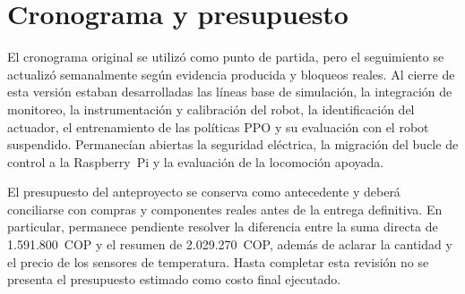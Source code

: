 \chapter{Cronograma y presupuesto}

El cronograma original se utilizó como punto de partida, pero el seguimiento
se actualizó semanalmente según evidencia producida y bloqueos reales. Al cierre
de esta versión estaban desarrolladas las líneas base de simulación, la
integración de monitoreo, la instrumentación y calibración del robot, la
identificación del actuador, el entrenamiento de las políticas PPO y su
evaluación con el robot suspendido. Permanecían abiertas la seguridad
eléctrica, la migración del bucle de control a la Raspberry~Pi y la evaluación
de la locomoción apoyada.

El presupuesto del anteproyecto se conserva como antecedente y deberá
conciliarse con compras y componentes reales antes de la entrega definitiva.
En particular, permanece pendiente resolver la diferencia entre la suma directa
de 1.591.800~COP y el resumen de 2.029.270~COP, además de aclarar la cantidad y
el precio de los sensores de temperatura. Hasta completar esta revisión no se
presenta el presupuesto estimado como costo final ejecutado.
